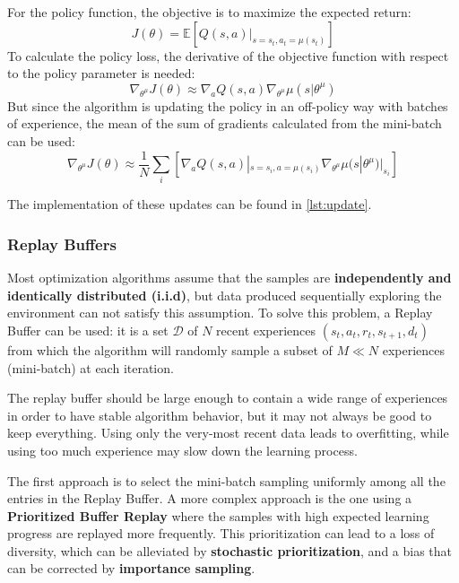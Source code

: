 \documentclass[a4paper, 11pt]{article}
\begin{document}
	For the policy function, the objective is to maximize the expected return:
	\begin{equation}\label{eq6:expected_r}
	J(\theta) = \mathbb{E}[Q(s,a)|_{s=s_t,a_t=\mu(s_t)}]
	\end{equation}	
	To calculate the policy loss, the derivative of the objective function with respect to the policy parameter is needed:
	\begin{equation}\label{eq7:derivative_exp}
	\nabla_{\theta^\mu} J(\theta) \approx \nabla_a Q(s,a) \nabla_{\theta^\mu}\mu(s|\theta^\mu)
	\end{equation}	
	But since the algorithm is updating the policy in an off-policy way with batches of experience, the mean of the sum of gradients calculated from the mini-batch can be used:
	\begin{equation}\label{eq8:mean_gradient}
	\nabla_{\theta^\mu} J(\theta) \approx \frac{1}{N}\sum_{i}[\nabla_a Q(s,a)|_{s=s_i, a = \mu(s_i)} \nabla_{\theta^\mu}\mu(s|\theta^\mu)|_{s_i}]
	\end{equation}
	
	The implementation of these updates can be found in \vref{lst:update}.
	

	
	
	\subsubsection{Replay Buffers} Most optimization algorithms assume that the samples are \textbf{independently and identically distributed (i.i.d)}, but data produced sequentially exploring the environment can not satisfy this assumption. To solve this problem, a Replay Buffer can be used: it is a set $\mathcal D$ of $N$ recent experiences $(s_t, a_t, r_t, s_{t+1}, d_t)$ from which the algorithm will randomly sample a subset of $M\ll N$ experiences (mini-batch) at each iteration.
	
	The replay buffer should be large enough to contain a wide range of experiences in order to have stable algorithm behavior, but it may not always be good to keep everything. Using only the very-most recent data leads to overfitting, while using too much experience may slow down the learning process.
	
	The first approach is to select the mini-batch sampling uniformly among all the entries in the Replay Buffer.
	A more complex approach is the one using a \textbf{Prioritized Buffer Replay} \cite{schaul2015prioritized} where the samples with high expected learning progress are replayed more frequently. This prioritization can lead to a loss of diversity, which can be alleviated by \textbf{stochastic prioritization}, and a bias that can be corrected by \textbf{importance sampling}.
	
\end{document}
